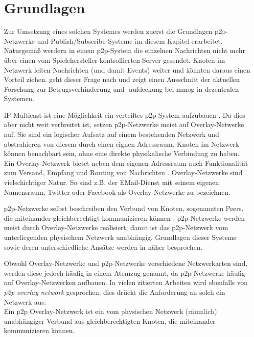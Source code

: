 \chapter{Grundlagen}
\label{chap:grundlagen}



Zur Umsetzung eines solchen Systemes werden zuerst die Grundlagen \ac{p2p}-Netzwerke und Publish/Subscribe-Systeme im diesem Kapitel erarbeitet. Naturgemäß werdern in einem \ac{p2p}-System die einzelnen Nachrichten nicht mehr über einen vom Spielehersteller kontrollierten Server gesendet. Knoten im Netzwerk leiten Nachrichten (und damit Events) weiter und könnten daraus einen Vorteil ziehen.  geht dieser Frage nach und zeigt einen Ausschnitt der aktuellen Forschung zur Betrugsverhinderung und -aufdeckung bei \ac{mmog} in dezentralen Systemen.

IP-Multicast ist eine Möglichkeit ein verteiltes \ac{p2p}-System aufzubauen \cite{Deering1990Multicast}. Da dies aber nicht weit verbreitet ist, setzen \ac{p2p}-Netzwerke meist auf Overlay-Netwerke auf. Sie sind ein logischer Aufsatz auf einem bestehenden Netzwerk und abstrahieren von diesem durch einen eignen Adressraum. Knoten im Netzwerk können benachbart sein, ohne eine direkte physikalische Verbindung zu haben. Ein Overlay-Netzwerk bietet neben dem eigenen Adressraum auch Funktionalität zum Versand, Empfang und Routing von Nachrichten \cite{Tannenbaum2003}. Overlay-Netzwerke sind vielschichtiger Natur. So sind z.B. der EMail-Dienst mit seinem eigenen Namensraum, Twitter oder Facebook als Overlay-Netzwerke zu bezeichnen.

p2p-Netzwerke selbst beschreiben den Verbund von Knoten, sogenannten Peers, die miteinander gleichberechtigt kommunizieren können \cite{Steinmetz2005}. p2p-Netzwerke werden meist durch Overlay-Netzwerke realisiert, damit ist das p2p-Netzwerk vom unterliegenden physischem Netzwerk unabhängig. Grundlagen dieser Systeme sowie deren unterschiedliche Ansätze werden in  näher besprochen.

Obwohl Overlay-Netzwerke und \ac{p2p}-Netzwerke verschiedene Netzwerkarten sind, werden diese jedoch häufig in einem Atemzug genannt, da p2p-Netzwerke häufig auf Overlay-Netzwerken aufbauen. In vielen zitierten Arbeiten wird ebenfalls von \emph{p2p overlay network} gesprochen; dies drückt die Anforderung an solch ein Netzwerk aus:\\
Ein p2p Overlay-Netzwerk ist ein vom physischen Netzwerk (räumlich) unabhängiger Verbund aus gleichberechtigten Knoten, die miteinander kommunizieren können.








